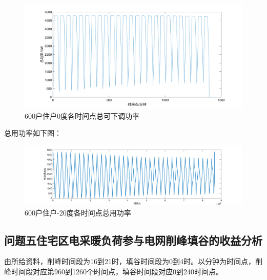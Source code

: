 \documentclass[withoutpreface,bwprint]{cumcmthesis} %
\begin{document}
    \begin{figure}[H]
    \centering
        \includegraphics[width=1\textwidth]{figures/4-0-down.png}
    \caption{600户住户0度各时间点总可下调功率}
    \label{fig:my_label}
    \end{figure}
   总用功率如下图：
     \begin{figure}[H]
    \centering
        \includegraphics[width=1\textwidth]{figures/4-total.png}
    \caption{600户住户-20度各时间点总用功率}
    \label{fig:my_label}
    \end{figure}
    \subsection{问题五\quad 住宅区电采暖负荷参与电网削峰填谷的收益分析}
    由所给资料，削峰时间段为16到21时，填谷时间段为0到4时。以分钟为时间点，削峰时间段对应第960到1260个时间点，填谷时间段对应0到240时间点。
\end{document}
